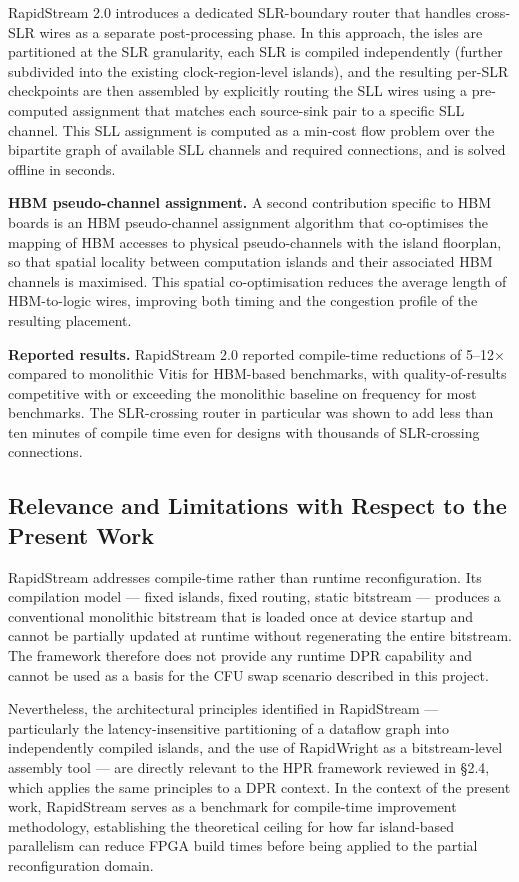 RapidStream 2.0 introduces a dedicated SLR-boundary router that handles cross-SLR wires as a separate post-processing phase. In this approach, the isles are partitioned at the SLR granularity, each SLR is compiled independently (further subdivided into the existing clock-region-level islands), and the resulting per-SLR checkpoints are then assembled by explicitly routing the SLL wires using a pre-computed assignment that matches each source-sink pair to a specific SLL channel. This SLL assignment is computed as a min-cost flow problem over the bipartite graph of available SLL channels and required connections, and is solved offline in seconds.

\textbf{HBM pseudo-channel assignment.} A second contribution specific to HBM boards is an HBM pseudo-channel assignment algorithm that co-optimises the mapping of HBM accesses to physical pseudo-channels with the island floorplan, so that spatial locality between computation islands and their associated HBM channels is maximised. This spatial co-optimisation reduces the average length of HBM-to-logic wires, improving both timing and the congestion profile of the resulting placement.

\textbf{Reported results.} RapidStream 2.0 reported compile-time reductions of 5–12× compared to monolithic Vitis for HBM-based benchmarks, with quality-of-results competitive with or exceeding the monolithic baseline on frequency for most benchmarks. The SLR-crossing router in particular was shown to add less than ten minutes of compile time even for designs with thousands of SLR-crossing connections.

\subsection{Relevance and Limitations with Respect to the Present Work}

RapidStream addresses compile-time rather than runtime reconfiguration. Its compilation model — fixed islands, fixed routing, static bitstream — produces a conventional monolithic bitstream that is loaded once at device startup and cannot be partially updated at runtime without regenerating the entire bitstream. The framework therefore does not provide any runtime DPR capability and cannot be used as a basis for the CFU swap scenario described in this project.

Nevertheless, the architectural principles identified in RapidStream — particularly the latency-insensitive partitioning of a dataflow graph into independently compiled islands, and the use of RapidWright as a bitstream-level assembly tool — are directly relevant to the HPR framework reviewed in §2.4, which applies the same principles to a DPR context. In the context of the present work, RapidStream serves as a benchmark for compile-time improvement methodology, establishing the theoretical ceiling for how far island-based parallelism can reduce FPGA build times before being applied to the partial reconfiguration domain.

